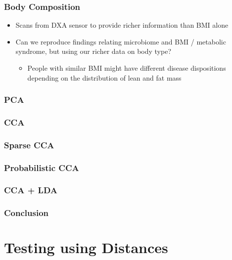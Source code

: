 \documentclass{beamer}
\begin{document}

\begin{frame}
  \frametitle{Body Composition}
  \begin{itemize}
  \item Scans from DXA sensor to provide richer information than BMI alone
  \item Can we reproduce findings relating microbiome and BMI / metabolic
    syndrome, but using our richer data on body type?
    \begin{itemize}
    \item People with similar BMI might have different disease dispositions
      depending on the distribution of lean and fat mass
    \end{itemize}
  \end{itemize}
\end{frame}

\begin{frame}
  \frametitle{PCA}

\end{frame}

\begin{frame}
  \frametitle{CCA}
\end{frame}

\begin{frame}
  \frametitle{Sparse CCA}
\end{frame}

\begin{frame}
  \frametitle{Probabilistic CCA}
\end{frame}

\begin{frame}
  \frametitle{CCA + LDA}
\end{frame}

\begin{frame}
  \frametitle{Conclusion}

\end{frame}



\section{Testing using Distances}
\label{sec:testing_distances}
\end{document}
